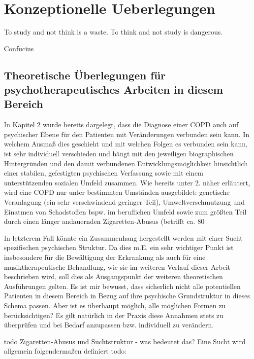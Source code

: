 
\chapter{Konzeptionelle Ueberlegungen}
\label{chapter:konzeptionelle_ueberlegungen}
\setlength{\epigraphwidth}{7.0cm}
\epigraph{To study and not think is a waste. To think and not study is dangerous.}{Confucius}
\section{Theoretische Überlegungen für psychotherapeutisches Arbeiten in diesem Bereich}
In Kapitel 2 wurde bereits dargelegt, dass die Diagnose einer COPD auch auf psychischer Ebene für den Patienten mit Veränderungen verbunden sein kann. In welchem Ausmaß dies geschieht und mit welchen Folgen es verbunden sein kann, ist sehr individuell verschieden und hängt mit den jeweiligen biographischen Hintergründen und den damit verbundenen Entwicklungsmöglichkeit hinsichtlich einer stabilen, gefestigten psychischen Verfassung sowie mit einem unterstützenden sozialen Umfeld zusammen. 
Wie bereits unter 2. näher erläutert, wird eine COPD nur unter bestimmten Umständen ausgebildet: genetische Veranlagung (ein sehr verschwindend geringer Teil), Umweltverschmutzung und Einatmen von Schadstoffen bspw. im beruflichen Umfeld sowie zum größten Teil durch einen länger andauernden Zigaretten-Abusus (betrifft ca. 80%

In letzterem Fall könnte ein Zusammenhang hergestellt werden mit einer Sucht spezifischen psychischen Struktur. Da dies m.E. ein sehr wichtiger Punkt ist insbesondere für die Bewältigung der Erkrankung als auch für eine musiktherapeutische Behandlung, wie sie im weiteren Verlauf dieser Arbeit beschrieben wird, soll dies als Ausgangspunkt der weiteren theoretischen Ausführungen gelten. Es ist mir bewusst, dass sicherlich nicht alle potentiellen Patienten in diesem Bereich in Bezug auf ihre psychische Grundstruktur in dieses Schema passen. Aber ist es überhaupt möglich, alle möglichen Formen zu berücksichtigen? Es gilt natürlich in der Praxis diese Annahmen stets zu überprüfen und bei Bedarf anzupassen bzw. individuell zu verändern. 

todo Zigaretten-Abusus und Suchtstruktur - was bedeutet das? Eine Sucht wird allgemein folgendermaßen definiert todo: 

